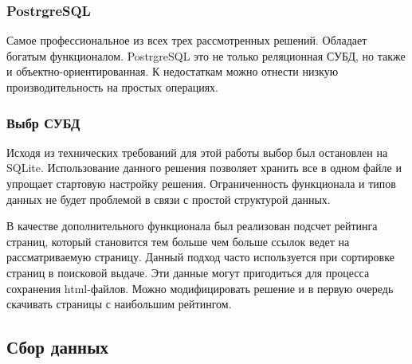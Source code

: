 \subsubsection{PostrgreSQL}

Самое профессиональное из всех трех рассмотренных решений. Обладает богатым функционалом. PostrgreSQL это не только реляционная СУБД, но также и объектно-ориентированная. К недостаткам можно отнести низкую производительность на простых операциях.

\subsubsection{Выбр СУБД}

Исходя из технических требований для этой работы выбор был остановлен на SQLite. Использование данного решения позволяет хранить все в одном файле и упрощает стартовую настройку решения. Ограниченность функционала и типов данных не будет проблемой в связи с простой структурой данных.

В качестве дополнительного функционала был реализован подсчет рейтинга страниц, который становится тем больше чем больше ссылок ведет на рассматриваемую страницу. Данный подход часто используется при сортировке страниц в поисковой выдаче. Эти данные могут пригодиться для процесса сохранения html-файлов. Можно модифицировать решение и в первую очередь скачивать страницы с наибольшим рейтингом.

\subsection{Сбор данных}


